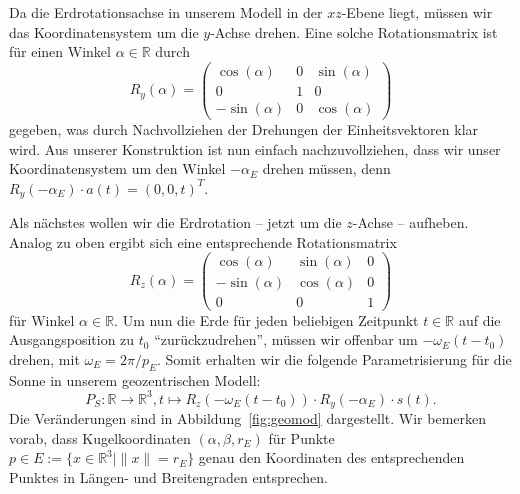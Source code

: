 \documentclass[
    paper=a4,
    DIV14,
    fontsize=12pt,
    pagesize=pdftex,
    toc=bibliographynumbered
]{scrartcl}
\numberwithin{figure}{section}
\numberwithin{equation}{section}
\numberwithin{table}{section}
\newcommand*\setR{\mathds{R}}
\begin{document}
Da die Erdrotationsachse in unserem Modell in der $xz$-Ebene liegt, müssen wir das
Koordinatensystem um die $y$-Achse drehen. Eine solche Rotationsmatrix ist für einen
Winkel $\alpha\in\setR$ durch
\begin{equation*}
    R_y(\alpha) =
    \begin{pmatrix}
        \cos(\alpha)  & 0 & \sin(\alpha) \\
        0             & 1 & 0            \\
        -\sin(\alpha) & 0 & \cos(\alpha)
    \end{pmatrix}
\end{equation*}
gegeben, was durch Nachvollziehen der Drehungen der Einheitsvektoren klar wird. Aus
unserer Konstruktion ist nun einfach nachzuvollziehen, dass wir unser Koordinatensystem um
den Winkel $-\alpha_E$ drehen müssen, denn $R_y(-\alpha_E)\cdot a(t) = (0, 0, t)^T$.

Als nächstes wollen wir die Erdrotation -- jetzt um die $z$-Achse -- aufheben. Analog zu
oben ergibt sich eine entsprechende Rotationsmatrix
\begin{equation*}
    R_z(\alpha) =
    \begin{pmatrix}
         \cos(\alpha) & \sin(\alpha) & 0 \\
        -\sin(\alpha) & \cos(\alpha) & 0 \\
        0             & 0            & 1
    \end{pmatrix}
\end{equation*}
für Winkel $\alpha\in\setR$. Um nun die Erde für jeden beliebigen Zeitpunkt $t\in\setR$
auf die Ausgangsposition zu $t_0$ \enquote{zurückzudrehen}, müssen wir offenbar um
$-\omega_E(t-t_0)$ drehen, mit $\omega_E = 2\pi/p_E$. Somit erhalten wir die folgende
Parametrisierung für die Sonne in unserem geozentrischen Modell:
\begin{equation*}
    P_S : \setR \to \setR^3, t\mapsto R_z(-\omega_E(t-t_0)) \cdot R_y(-\alpha_E) \cdot
    s(t).
\end{equation*}
Die Veränderungen sind in Abbildung~\ref{fig:geomod} dargestellt. Wir bemerken vorab, dass
Kugelkoordinaten $(\alpha, \beta, r_E)$ für Punkte $p \in E := \{ x\in\setR^3 \mid \|x\| =
r_E \}$ genau den Koordinaten des entsprechenden Punktes in Längen- und Breitengraden
entsprechen.
\end{document}
